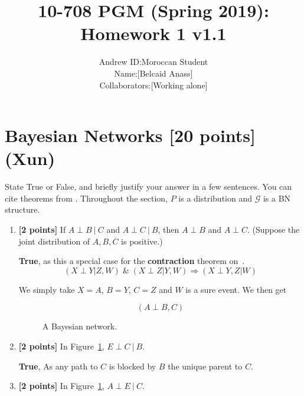 \documentclass[12pt]{article}
\title{10-708 PGM (Spring 2019): Homework 1
{\color{red} v1.1}
}
\author{
\begin{tabular}{rl}
Andrew ID: & Moroccan Student\\
Name: & [Belcaid Anass] \\
Collaborators: & [Working alone]
\end{tabular}
}
\date{}
\newcommand{\Gcal}{\mathcal{G}}
\begin{document}
\maketitle



\section{Bayesian Networks [20 points] (Xun)}

State True or False, and briefly justify your answer in a few sentences. You can cite theorems from \citet{koller2009probabilistic}. Throughout the section, $P$ is a distribution and $\Gcal$ is a BN structure. 

\begin{enumerate}

\item \textbf{[2 points]} If $ A \perp B \ | \ C $ and $ A \perp C \ | \ B $, then $ A \perp B $ and $ A \perp C $. 
(Suppose the joint distribution of $ A, B, C $ is positive.)

\begin{solution}
 \textbf{True}, as this a special case for the \textbf{contraction} theorem
 on~\cite{koller2009probabilistic}. 
\[
  (X \perp Y | Z, W)\;\&\;(X \perp Z | Y, W) \Longrightarrow (X \perp Y, Z | W)
\]

We simply take $X=A$, $B=Y$, $C=Z$ and $W$ is a sure event. We then get

\[
  (A \perp B, C)
\]

\end{solution}

\begin{figure}[h]
\centering
{}
\caption{A Bayesian network.}
\label{fig:y-bayesnet}
\end{figure}


\item \textbf{[2 points]} In Figure~\ref{fig:y-bayesnet}, $ E \perp C \ | \ B $.

\begin{solution}
  \textbf{True}, As any path to $C$ is blocked by $B$ the unique parent to
  $C$.
\end{solution}

\item \textbf{[2 points]} In Figure~\ref{fig:y-bayesnet}, $ A \perp E \ | \ C $.


\end{enumerate}
\end{document}
